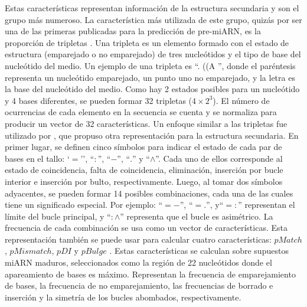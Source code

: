 Estas características representan información de la estructura secundaria y son el grupo más numeroso. La característica más utilizada de este grupo, quizás por
ser una de las primeras publicadas para la predicción de pre-miARN, es la proporción de tripletas \citep{xue2005classification}. Una tripleta es un elemento
formado con el estado de estructura (emparejado o no emparejado) de tres nucleótidos y el tipo de base del nucleótido del medio. Un ejemplo de una tripleta es
``. ((A '', donde el paréntesis representa un nucleótido emparejado, un punto uno no emparejado, y la letra es la base del nucleótido del medio. Como hay 2
estados posibles para un nucleótido y 4 bases diferentes, se pueden formar 32 tripletas ($4\times2^{3} $). El número de ocurrencias de cada elemento en la
secuencia se cuenta y se normaliza para producir un vector de 32 características. Un enfoque similar a las tripletas fue utilizado por
\cite{huang2007mirfinder}, que propuso otra representación para la estructura secundaria. En primer lugar, se definen cinco símbolos para indicar el estado de
cada par de bases en el tallo: `$=$'', ``$:$'', ``$-$'', ``$.$'' y ``$\wedge$''. Cada uno de ellos corresponde al estado de coincidencia, falta de coincidencia,
eliminación, inserción por bucle interior e inserción por bulto, respectivamente. Luego, al tomar dos símbolos adyacentes, se pueden formar 14 posibles
combinaciones, cada una de las cuales tiene un significado especial. Por ejemplo: ``$=-$'', ``$=.$'', y``$=:$'' representan el límite del bucle principal, y
``$:\wedge$'' representa que el bucle es asimétrico. La frecuencia de cada combinación se usa como un vector de características. Esta representación también se
puede usar para calcular cuatro características: $pMatch$, $pMismatch$, $pDI$ y $pBulge$ \citep{huang2007mirfinder}. Estas características se calculan sobre
supuestos miARN maduros, seleccionados como la región de 22 nucleótidos donde el apareamiento de bases es máximo. Representan la frecuencia de
emparejamiento de bases, la frecuencia de no emparejamiento, las frecuencias de borrado e inserción y la simetría de los bucles abombados, respectivamente.

